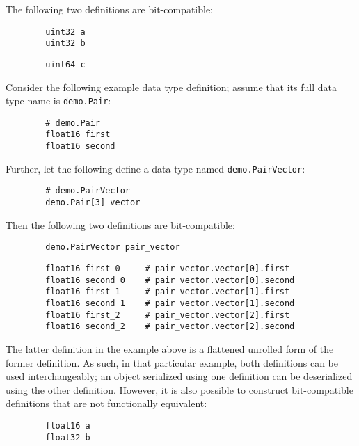 \begin{remark}[breakable]
    The following two definitions are bit-compatible:

    \begin{verbatim}
        uint32 a
        uint32 b
    \end{verbatim}

    \begin{verbatim}
        uint64 c
    \end{verbatim}

    Consider the following example data type definition; assume that its full data type name is
    \verb|demo.Pair|:

    \begin{verbatim}
        # demo.Pair
        float16 first
        float16 second
    \end{verbatim}

    Further, let the following define a data type named \verb|demo.PairVector|:

    \begin{verbatim}
        # demo.PairVector
        demo.Pair[3] vector
    \end{verbatim}

    Then the following two definitions are bit-compatible:

    \begin{verbatim}
        demo.PairVector pair_vector
    \end{verbatim}

    \begin{verbatim}
        float16 first_0     # pair_vector.vector[0].first
        float16 second_0    # pair_vector.vector[0].second
        float16 first_1     # pair_vector.vector[1].first
        float16 second_1    # pair_vector.vector[1].second
        float16 first_2     # pair_vector.vector[2].first
        float16 second_2    # pair_vector.vector[2].second
    \end{verbatim}

    The latter definition in the example above is a flattened unrolled form of the former definition.
    As such, in that particular example, both definitions can be used interchangeably;
    an object serialized using one definition can be deserialized using the other definition.
    However, it is also possible to construct bit-compatible definitions that are not functionally equivalent:

    \begin{verbatim}
        float16 a
        float32 b
    \end{verbatim}


\end{remark}

